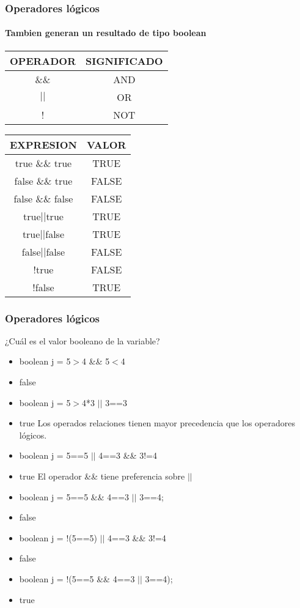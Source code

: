 \documentclass{beamer}
\begin{document}
\begin{frame}[fragile]
    \frametitle{Operadores lógicos}
    \framesubtitle{Tambien generan un resultado de tipo boolean}
    \pause
    \begin{center}
		\begin{tabular}{|c|c|}
		\hline
		OPERADOR & SIGNIFICADO\\
		\hline
		\&\& & AND \\
		\hline
		$||$ & OR \\
		\hline
		! & NOT \\
		\hline
		
\end{tabular}
	\end{center}
	\pause
    \begin{center}
		\begin{tabular}{|c|c|}
		\hline
		EXPRESION & VALOR\\
		\hline
		true \&\& true & TRUE \\
		\hline
		false \&\& true & FALSE \\
		\hline
		false \&\& false & FALSE \\
		\hline
		true$||$true & TRUE \\
		\hline
		true$||$false & TRUE \\
		\hline
		false$||$false & FALSE \\
		\hline
		!true & FALSE \\
		\hline
		!false & TRUE \\
		\hline
		
\end{tabular}
	\end{center}
\end{frame}

\begin{frame}
    \frametitle{Operadores lógicos}
¿Cuál es el valor booleano de la variable?
\begin{itemize}[<+->]

      \item boolean j = 5$>$4 \&\& 5$<$4
      \item \alert{false} 
      \item boolean j = 5$>$4*3 $||$ 3==3
      \item \alert{true} Los operados relaciones tienen mayor precedencia que los operadores lógicos.
      \item boolean j = 5==5 $||$ 4==3 \&\& 3!=4
      \item \alert{true} El operador \&\& tiene preferencia sobre $||$
      \item boolean j = 5==5 \&\& 4==3 $||$ 3==4;
      \item \alert{false}
      \item boolean j = !(5==5) $||$ 4==3 \&\& 3!=4
      \item \alert{false} 
      \item boolean j = !(5==5 \&\& 4==3 $||$ 3==4);
      \item \alert{true}
      
      \end{itemize}
      \pause
\end{frame}
\end{document}
